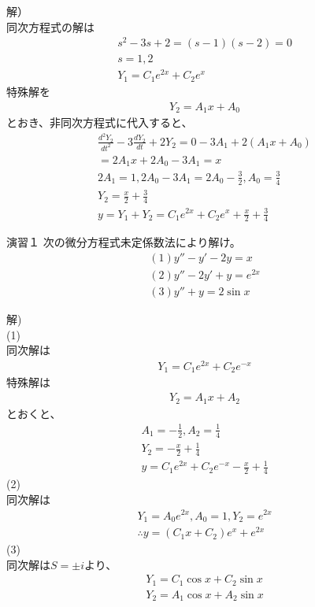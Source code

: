 \documentclass{jsarticle}
\begin{document}
解）\\
同次方程式の解は
\begin{eqnarray}
s^2-3s+2=(s-1)(s-2)=0\\
s=1,2\\
Y_1=C_1e^{2x}+C_2e^x
\end{eqnarray}
特殊解を
\begin{eqnarray}
Y_2=A_1x+A_0
\end{eqnarray}
とおき、非同次方程式に代入すると、
\begin{eqnarray}
\frac{d^2Y_2}{dt^2}-3\frac{dY_2}{dt}+2Y_2=0-3A_1+2(A_1x+A_0)\\
=2A_1x+2A_0-3A_1=x\\
2A_1=1,2A_0-3A_1=2A_0-\frac{3}{2},A_0=\frac{3}{4}\\
Y_2=\frac{x}{2}+\frac{3}{4}\\
y=Y_1+Y_2=C_1e^{2x}+C_2e^x+\frac{x}{2}+\frac{3}{4}
\end{eqnarray}
\begin{itembox}[l]{演習１}
次の微分方程式未定係数法により解け。
\begin{eqnarray}
(1)y''-y'-2y=x\\
(2)y''-2y'+y=e^{2x}\\
(3)y''+y=2\sin x
\end{eqnarray}
\end{itembox}
解)\\
(1)\\
同次解は
\begin{eqnarray}
Y_1=C_1e^{2x}+C_2e^{-x}
\end{eqnarray}
特殊解は
\begin{eqnarray}
Y_2=A_1x+A_2
\end{eqnarray}
とおくと、
\begin{eqnarray}
A_1=-\frac{1}{2},A_2=\frac{1}{4}\\
Y_2=-\frac{x}{2}+\frac{1}{4}\\
y=C_1e^{2x}+C_2e^{-x}-\frac{x}{2}+\frac{1}{4}
\end{eqnarray}
(2)\\
同次解は
\begin{eqnarray}
Y_1=A_0e^{2x},A_0=1,Y_2=e^{2x}\\
\therefore y=(C_1x+C_2)e^x+e^{2x}
\end{eqnarray}
(3)\\
同次解は$S=\pm i$より、
\begin{eqnarray}
Y_1=C_1\cos x+C_2\sin x\\
Y_2=A_1\cos x+A_2\sin x
\end{eqnarray}
\end{document}
